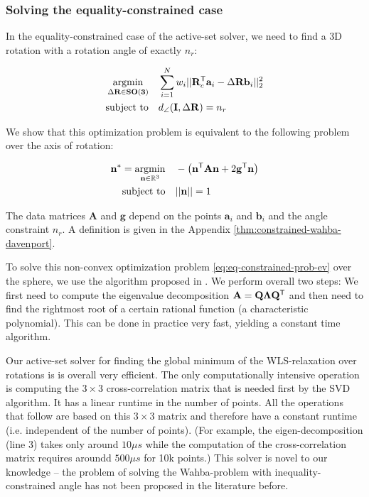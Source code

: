 \subsubsection{Solving the equality-constrained case}
In the equality-constrained case of the active-set solver, we need to find a 3D rotation with a rotation angle of exactly $n_r$:

\begin{equation}
	\label{eq:tls-rwls-eq}
	\begin{aligned}
		\operatorname*{argmin}_{\Delta \mathbf{R} \in \mathbf{SO(3)}}  \quad &\sum_{i=1}^{N} w_i ||\mathbf{R}_c^{\mathsf{T}} \mathbf{a}_i - \Delta\mathbf{R} \mathbf{b}_i ||_2^2 \\
		\text{subject to} \quad &d_{\angle}(\mathbf{I}, \Delta\mathbf{R}) = n_r
	\end{aligned}
\end{equation}

We show that this optimization problem is equivalent to the following problem over the axis of rotation:

\begin{equation}
	\begin{aligned}
		\label{eq:eq-constrained-prob-ev}
		\mathbf{n}^* = \operatorname*{argmin}_{\mathbf{n} \in \mathbb{R}^3} \quad &-\left(\mathbf{n}^{\mathsf{T}} \mathbf{A} \mathbf{n} + 2 \mathbf{g}^{\mathsf{T}} \mathbf{n} \right)\\
		\text{subject to} \quad &|| \mathbf{n}|| = 1\\
	\end{aligned}
\end{equation}

The data matrices $\mathbf{A}$ and $\mathbf{g}$ depend on the points $\mathbf{a}_i$ and $\mathbf{b}_i$ and the angle constraint $n_r$. A definition is given in the Appendix \ref{thm:constrained-wahba-davenport}.

To solve this non-convex optimization problem \ref{eq:eq-constrained-prob-ev} over the sphere, we use the algorithm proposed in \cite{10.1007/978-3-642-75536-1_57}. We perform overall two steps: We first need to compute the eigenvalue decomposition  $\mathbf{A} = \mathbf{Q}\mathbf{\Lambda}\mathbf{Q}^{\mathsf{T}}$ and then need to find the rightmost root of a certain rational function (a characteristic polynomial). This can be done in practice very fast, yielding a constant time algorithm.


Our active-set solver for finding the global minimum of the WLS-relaxation over rotations is is overall very efficient. The only computationally intensive operation is computing the $3 \times 3$ cross-correlation matrix that is needed first by the SVD algorithm. It has a linear runtime in the number of points. All the operations that follow are based on this $3 \times 3$ matrix and therefore have a constant runtime (i.e. independent of the number of points). (For example, the eigen-decomposition (line 3) takes only around $10 \mu s$ while the computation of the cross-correlation matrix requires aroundd $500 \mu s$ for 10k points.)
This solver is novel to our knowledge -- the problem of solving the Wahba-problem with inequality-constrained angle has not been proposed in the literature before.
